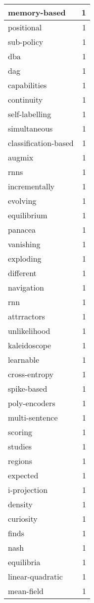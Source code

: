 \begin{table}[h]
\begin{tabular}{|l|r|}
\hline
memory-based & 1 \\
\hline
positional & 1 \\
\hline
sub-policy & 1 \\
\hline
dba & 1 \\
\hline
dag & 1 \\
\hline
capabilities & 1 \\
\hline
continuity & 1 \\
\hline
self-labelling & 1 \\
\hline
simultaneous & 1 \\
\hline
classification-based & 1 \\
\hline
augmix & 1 \\
\hline
rnns & 1 \\
\hline
incrementally & 1 \\
\hline
evolving & 1 \\
\hline
equilibrium & 1 \\
\hline
panacea & 1 \\
\hline
vanishing & 1 \\
\hline
exploding & 1 \\
\hline
different & 1 \\
\hline
navigation & 1 \\
\hline
rnn & 1 \\
\hline
attrractors & 1 \\
\hline
unlikelihood & 1 \\
\hline
kaleidoscope & 1 \\
\hline
learnable & 1 \\
\hline
cross-entropy & 1 \\
\hline
spike-based & 1 \\
\hline
poly-encoders & 1 \\
\hline
multi-sentence & 1 \\
\hline
scoring & 1 \\
\hline
studies & 1 \\
\hline
regions & 1 \\
\hline
expected & 1 \\
\hline
i-projection & 1 \\
\hline
density & 1 \\
\hline
curiosity & 1 \\
\hline
finds & 1 \\
\hline
nash & 1 \\
\hline
equilibria & 1 \\
\hline
linear-quadratic & 1 \\
\hline
mean-field & 1 \\

\end{tabular}
\end{table}
